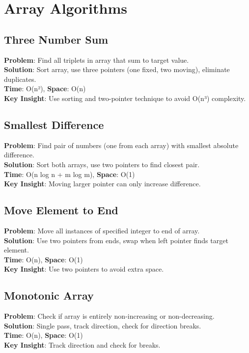 \documentclass{report}
\begin{document}
\section{Array Algorithms}

\subsection{Three Number Sum}
\textbf{Problem}: Find all triplets in array that sum to target value.\\
\textbf{Solution}: Sort array, use three pointers (one fixed, two moving), eliminate duplicates.\\
\textbf{Time}: O(n²), \textbf{Space}: O(n)\\
\textbf{Key Insight}: Use sorting and two-pointer technique to avoid O(n³) complexity.

\subsection{Smallest Difference}
\textbf{Problem}: Find pair of numbers (one from each array) with smallest absolute difference.\\
\textbf{Solution}: Sort both arrays, use two pointers to find closest pair.\\
\textbf{Time}: O(n log n + m log m), \textbf{Space}: O(1)\\
\textbf{Key Insight}: Moving larger pointer can only increase difference.

\subsection{Move Element to End}
\textbf{Problem}: Move all instances of specified integer to end of array.\\
\textbf{Solution}: Use two pointers from ends, swap when left pointer finds target element.\\
\textbf{Time}: O(n), \textbf{Space}: O(1)\\
\textbf{Key Insight}: Use two pointers to avoid extra space.

\subsection{Monotonic Array}
\textbf{Problem}: Check if array is entirely non-increasing or non-decreasing.\\
\textbf{Solution}: Single pass, track direction, check for direction breaks.\\
\textbf{Time}: O(n), \textbf{Space}: O(1)\\
\textbf{Key Insight}: Track direction and check for breaks.
\end{document}
